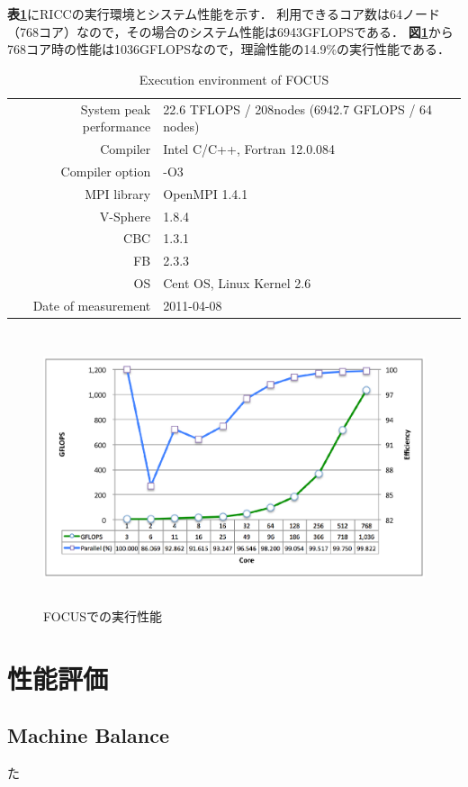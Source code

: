 \textbf{表\ref{tbl:focus-env}}にRICCの実行環境とシステム性能を示す．
利用できるコア数は64ノード（768コア）なので，その場合のシステム性能は6943GFLOPSである．
\textbf{図\ref{fig:focus-perf}}から768コア時の性能は1036GFLOPSなので，理論性能の14.9\%の実行性能である．

\begin{table}[htdp]
\caption{Execution environment of FOCUS}
\small
\begin{center}
\begin{tabular}{rl}\toprule
System peak performance & 22.6 TFLOPS / 208nodes (6942.7 GFLOPS / 64 nodes)\\
Compiler & Intel C/C++, Fortran 12.0.084\\
Compiler option & -O3\\
MPI library & OpenMPI 1.4.1\\
V-Sphere & 1.8.4\\
CBC & 1.3.1\\
FB & 2.3.3\\
OS & Cent OS, Linux Kernel 2.6\\
Date of measurement & 2011-04-08\\ \bottomrule
\end{tabular}
\end{center}
\label{tbl:focus-env}
\end{table}

\begin{figure}[htdp]
\begin{center}
\includegraphics[height=8cm,clip]{focus.eps}
\end{center}
\caption{FOCUSでの実行性能}
\label{fig:focus-perf}
\end{figure}

\pagebreak
\hypertarget{tgt:perf prediction}{\section{性能評価}}
%
\subsection{Machine Balance}



た\cite{treibig:10:springerlink}
